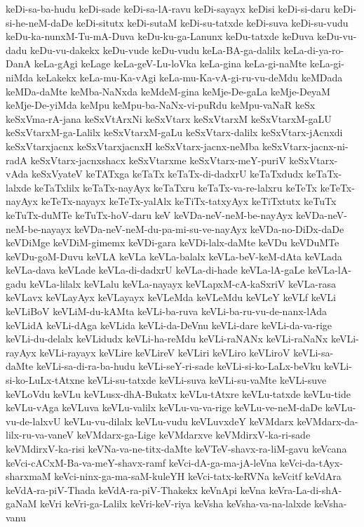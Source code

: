 {keDi-sa-ba-hudu
keDi-sade
keDi-sa-lA-ravu
keDi-sayayx
keDisi
keDi-si-daru
keDi-si-he-neM-daDe
keDi-situtx
keDi-sutaM
keDi-su-tatxde
keDi-suva
keDi-su-vudu
keDu-ka-nunxM-Tu-mA-Duva
keDu-ku-ga-Lanunx
keDu-tatxde
keDuva
keDu-vu-dadu
keDu-vu-dakekx
keDu-vude
keDu-vudu
keLa-BA-ga-dalilx
keLa-di-ya-ro-DanA
keLa-gAgi
keLage
keLa-geV-Lu-loVka
keLa-gina
keLa-gi-naMte
keLa-gi-niMda
keLakekx
keLa-mu-Ka-vAgi
keLa-mu-Ka-vA-gi-ru-vu-deMdu
keMDada
keMDa-daMte
keMba-NaNxda
keMdeM-gina
keMje-De-gaLa
keMje-DeyaM
keMje-De-yiMda
keMpu
keMpu-ba-NaNx-vi-puRdu
keMpu-vaNaR
keSx
keSxVma-rA-jana
keSxVtArxNi
keSxVtarx
keSxVtarxM
keSxVtarxM-gaLU
keSxVtarxM-ga-Lalilx
keSxVtarxM-gaLu
keSxVtarx-dalilx
keSxVtarx-jAcnxdi
keSxVtarxjacnx
keSxVtarxjacnxH
keSxVtarx-jacnx-neMba
keSxVtarx-jacnx-ni-radA
keSxVtarx-jacnxshacx
keSxVtarxme
keSxVtarx-meY-puriV
keSxVtarx-vAda
keSxVyateV
keTATxga
keTaTx
keTaTx-di-dadxrU
keTaTxdudx
keTaTx-lalxde
keTaTxlilx
keTaTx-nayAyx
keTaTxru
keTaTx-va-re-lalxru
keTeTx
keTeTx-nayAyx
keTeTx-nayayx
keTeTx-yalAlx
keTiTx-tatxyAyx
keTiTxtutx
keTuTx
keTuTx-duMTe
keTuTx-hoV-daru
keV
keVDa-neV-neM-be-nayAyx
keVDa-neV-neM-be-nayayx
keVDa-neV-neM-du-pa-mi-su-ve-nayAyx
keVDa-no-DiDx-daDe
keVDiMge
keVDiM-gimemx
keVDi-gara
keVDi-lalx-daMte
keVDu
keVDuMTe
keVDu-goM-Duvu
keVLA
keVLa
keVLa-balalx
keVLa-beV-keM-dAta
keVLada
keVLa-dava
keVLade
keVLa-di-dadxrU
keVLa-di-hade
keVLa-lA-gaLe
keVLa-lA-gadu
keVLa-lilalx
keVLalu
keVLa-nayayx
keVLapxM-cA-kaSxriV
keVLa-rasa
keVLavx
keVLayAyx
keVLayayx
keVLeMda
keVLeMdu
keVLeY
keVLf
keVLi
keVLiBoV
keVLiM-du-kAMta
keVLi-ba-ruva
keVLi-ba-ru-vu-de-nanx-lAda
keVLidA
keVLi-dAga
keVLida
keVLi-da-DeVnu
keVLi-dare
keVLi-da-va-rige
keVLi-du-delalx
keVLidudx
keVLi-ha-reMdu
keVLi-raNANx
keVLi-raNaNx
keVLi-rayAyx
keVLi-rayayx
keVLire
keVLireV
keVLiri
keVLiro
keVLiroV
keVLi-sa-daMte
keVLi-sa-di-ra-ba-hudu
keVLi-seY-ri-sade
keVLi-si-ko-LaLx-beVku
keVLi-si-ko-LuLx-tAtxne
keVLi-su-tatxde
keVLi-suva
keVLi-su-vaMte
keVLi-suve
keVLoVdu
keVLu
keVLusx-dhA-Bukatx
keVLu-tAtxre
keVLu-tatxde
keVLu-tide
keVLu-vAga
keVLuva
keVLu-valilx
keVLu-va-va-rige
keVLu-ve-neM-daDe
keVLu-vu-de-lalxvU
keVLu-vu-dilalx
keVLu-vudu
keVLuvxdeY
keVMdarx
keVMdarx-da-lilx-ru-va-vaneV
keVMdarx-ga-Lige
keVMdarxve
keVMdirxV-ka-ri-sade
keVMdirxV-ka-risi
keVNa-va-ne-titx-daMte
keVTeV-shavx-ra-liM-gavu
keVcana
keVci-cACxM-Ba-va-meY-shavx-ramf
keVci-dA-ga-ma-jA-leVna
keVci-da-tAyx-sharxmaM
keVci-ninx-ga-ma-saM-kuleYH
keVci-tatx-keRVNa
keVcitf
keVdAra
keVdA-ra-piV-Thada
keVdA-ra-piV-Thakekx
keVnApi
keVna
keVra-La-di-shA-gaNaM
keVri
keVri-ga-Lalilx
keVri-keV-riya
keVsha
keVsha-va-na-lalxde
keVsha-vanu
}
